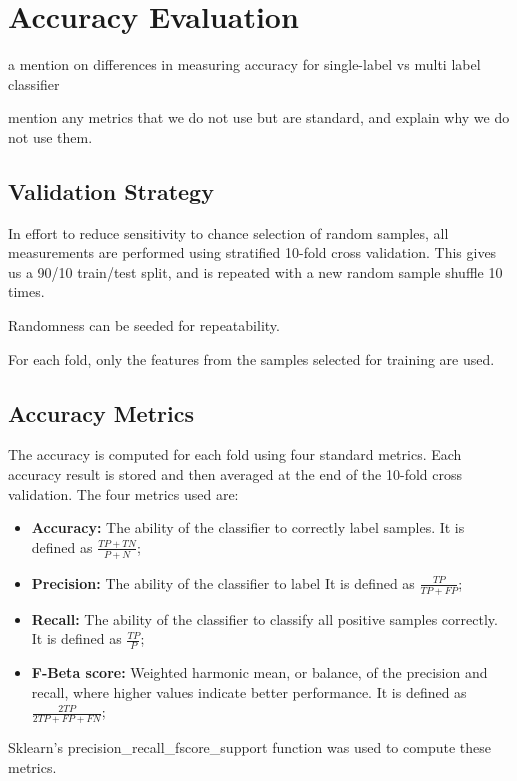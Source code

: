 \section{Accuracy Evaluation}

a mention on differences in measuring accuracy for single-label vs multi
label classifier

mention any metrics that we do not use but are standard, and explain
why we do not use them.

\subsection{Validation Strategy}
In effort to reduce sensitivity to chance selection of random samples, all
measurements are performed using stratified 10-fold cross validation.
This gives us a 90/10 train/test split, and is repeated with a new random sample
shuffle 10 times.

Randomness can be seeded for repeatability.

For each fold, only the features from the samples selected for training are
used.

\subsection{Accuracy Metrics}
The accuracy is computed for each fold using four standard metrics.
Each accuracy result is stored and then averaged at the end of the 10-fold
cross validation.
The four metrics used are:
\begin{itemize}
  \item \textbf{Accuracy:}
    The ability of the classifier to correctly label samples.
    It is defined as $\frac{TP+TN}{P+N}$;

  \item \textbf{Precision:}
    The ability of the classifier to label 
    It is defined as $\frac{TP}{TP+FP}$;

  \item \textbf{Recall:}
    The ability of the classifier to classify all positive samples correctly.
    It is defined as $\frac{TP}{P}$;

  \item \textbf{F-Beta score:}
    Weighted harmonic mean, or balance, of the precision and recall, where
    higher values indicate better performance.
    It is defined as $\frac{2TP}{2TP+FP+FN}$;
\end{itemize}

Sklearn's precision\_recall\_fscore\_support function was used to compute these
metrics.

